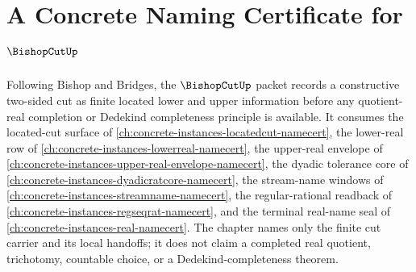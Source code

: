 \chapter{A Concrete Naming Certificate for $\BishopCutUp$}
\label{ch:concrete-instances-bishop-cut-namecert}

Following Bishop and Bridges, the $\BishopCutUp$ packet records a constructive two-sided cut as finite located lower and upper information before any quotient-real completion or Dedekind completeness principle is available. It consumes the located-cut surface of \autoref{ch:concrete-instances-locatedcut-namecert}, the lower-real row of \autoref{ch:concrete-instances-lowerreal-namecert}, the upper-real envelope of \autoref{ch:concrete-instances-upper-real-envelope-namecert}, the dyadic tolerance core of \autoref{ch:concrete-instances-dyadicratcore-namecert}, the stream-name windows of \autoref{ch:concrete-instances-streamname-namecert}, the regular-rational readback of \autoref{ch:concrete-instances-regseqrat-namecert}, and the terminal real-name seal of \autoref{ch:concrete-instances-real-namecert}. The chapter names only the finite cut carrier and its local handoffs; it does not claim a completed real quotient, trichotomy, countable choice, or a Dedekind-completeness theorem.

